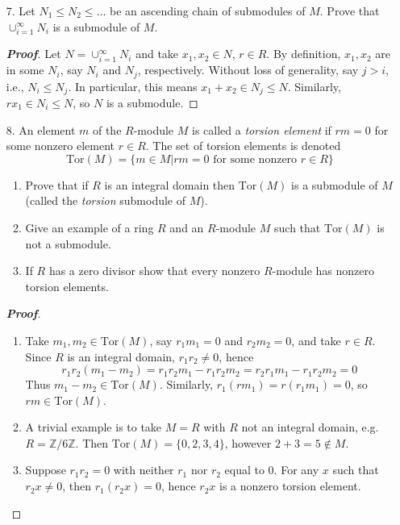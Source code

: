 \documentclass[12pt,leqno]{book}
\theoremstyle{definition}
\newcommand{\Z}{\mathbb{Z}}
\newenvironment{Proof}{\begin{proof}[\textnormal{\textbf{Proof}}]}{\end{proof}}
\begin{document}
\begin{enumerate}
\begin{Proof}
\end{Proof}

 \item [7.] Let $N_1\leq N_2\leq\hdots$ be an ascending chain of submodules of $M$. Prove that $\cup_{i=1}^{\infty}N_i$ is a submodule of $M$.

\begin{Proof}
 Let $N=\cup_{i=1}^{\infty}N_i$ and take $x_1,x_2\in N$, $r\in R$. By definition, $x_1,x_2$ are in some $N_i$, say $N_i$ and $N_j$, respectively. Without loss of generality, say $j>i$, i.e., $N_i\leq N_j$. In particular, this means $x_1+x_2\in N_j\leq N$. Similarly, $rx_1\in N_i\leq N$, so $N$ is a submodule.
\end{Proof}

 \item [8.] An element $m$ of the $R$-module $M$ is called a \textit{torsion element} if $rm=0$ for some nonzero element $r\in R$. The set of torsion elements is denoted \[\text{Tor}(M)=\{m\in M|rm=0\text{ for some nonzero }r\in R\}\]
  \begin{enumerate}
   \item Prove that if $R$ is an integral domain then $\text{Tor}(M)$ is a submodule of $M$ (called the \textit{torsion} submodule of $M$).
   \item Give an example of a ring $R$ and an $R$-module $M$ such that $\text{Tor}(M)$ is not a submodule.
   \item If $R$ has a zero divisor show that every nonzero $R$-module has nonzero torsion elements.
  \end{enumerate}

\begin{Proof}\indent
 \begin{enumerate}
  \item Take $m_1,m_2\in\text{Tor}(M)$, say $r_1m_1=0$ and $r_2m_2=0$, and take $r\in R$. Since $R$ is an integral domain, $r_1r_2\not=0$, hence \[r_1r_2(m_1-m_2)=r_1r_2m_1-r_1r_2m_2=r_2r_1m_1-r_1r_2m_2=0\] Thus $m_1-m_2\in\text{Tor}(M)$. Similarly, $r_1(rm_1)=r(r_1m_1)=0$, so $rm\in\text{Tor}(M)$.
  \item A trivial example is to take $M=R$ with $R$ not an integral domain, e.g. $R=\Z/6\Z$. Then $\text{Tor}(M)=\{0,2,3,4\}$, however $2+3=5\notin M$.
  \item Suppose $r_1r_2=0$ with neither $r_1$ nor $r_2$ equal to 0. For any $x$ such that $r_2x\not=0$, then $r_1(r_2x)=0$, hence $r_2x$ is a nonzero torsion element.
 \end{enumerate}


\end{Proof}
\end{enumerate}
\end{document}
